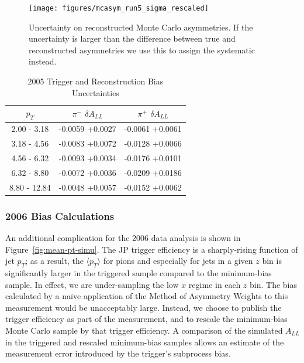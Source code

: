 \begin{figure}
  \texttt{[image: figures/mcasym\_run5\_sigma\_rescaled]}
  \caption{Uncertainty on reconstructed Monte Carlo asymmetries. If the
  uncertainty is larger than the difference between true and reconstructed
  asymmetries we use this to assign the systematic instead.}
  \label{fig:mcasym-sigma}
\end{figure}

\begin{table}[ht]
    \begin{center}
        \begin{tabular}{c|c|c}
        \hline
        $p_{T}$ & $\pi^{-}$ $\delta A_{LL}$ & $\pi^{+}$ $\delta A_{LL}$\\
        \hline
        2.00 - 3.18 & -0.0059 +0.0027 & -0.0061 +0.0061\\
        3.18 - 4.56 & -0.0083 +0.0072 & -0.0128 +0.0066\\
        4.56 - 6.32 & -0.0093 +0.0034 & -0.0176 +0.0101\\
        6.32 - 8.80 & -0.0072 +0.0036 & -0.0209 +0.0186\\
        8.80 - 12.84 & -0.0048 +0.0057 & -0.0152 +0.0062\\
    \hline
    \end{tabular}
    \end{center}
    \caption{2005 Trigger and Reconstruction Bias Uncertainties}
    \label{tbl:trig-reco-bias}
\end{table}

\subsubsection{2006 Bias Calculations}

An additional complication for the 2006 data analysis is shown in Figure~\ref{fig:mean-pt-simu}.  The JP trigger efficiency is a sharply-rising function of jet \(p_T\); as a result, the \(\langle p_T \rangle\) for pions and especially for jets in a given \(z\) bin is significantly larger in the triggered sample compared to the minimum-bias sample.  In effect, we are under-sampling the low \(x\) regime in each \(z\) bin.  The bias calculated by a na\"ive application of the Method of Asymmetry Weights to this measurement would be unacceptably large.  Instead, we choose to publish the trigger efficiency as part of the measurement, and to rescale the minimum-bias Monte Carlo sample by that trigger efficiency.  A comparison of the simulated \(A_{LL}\) in the triggered and rescaled minimum-bias samples allows an estimate of the measurement error introduced by the trigger's subprocess bias.

